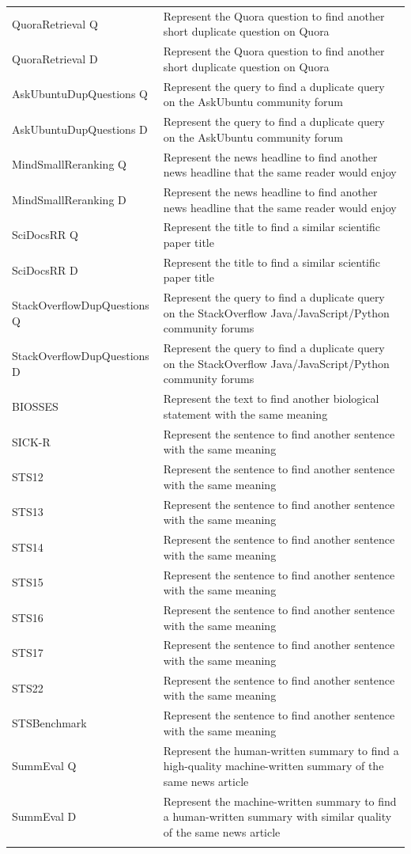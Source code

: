 \documentclass{article}
\begin{document}
\begin{longtable}{lp{9cm}}
QuoraRetrieval Q & Represent the Quora question to find another short duplicate question on Quora \\
QuoraRetrieval D & Represent the Quora question to find another short duplicate question on Quora \\
\midrule
AskUbuntuDupQuestions Q & Represent the query to find a duplicate query on the AskUbuntu community forum \\
AskUbuntuDupQuestions D & Represent the query to find a duplicate query on the AskUbuntu community forum \\
MindSmallReranking Q & Represent the news headline to find another news headline that the same reader would enjoy \\
MindSmallReranking D & Represent the news headline to find another news headline that the same reader would enjoy \\
SciDocsRR Q & Represent the title to find a similar scientific paper title \\
SciDocsRR D & Represent the title to find a similar scientific paper title \\
StackOverflowDupQuestions Q & Represent the query to find a duplicate query on the StackOverflow Java/JavaScript/Python community forums \\
StackOverflowDupQuestions D & Represent the query to find a duplicate query on the StackOverflow Java/JavaScript/Python community forums \\
\midrule
BIOSSES & Represent the text to find another biological statement with the same meaning \\
SICK-R & Represent the sentence to find another sentence with the same meaning \\
STS12 & Represent the sentence to find another sentence with the same meaning \\
STS13 & Represent the sentence to find another sentence with the same meaning \\
STS14 & Represent the sentence to find another sentence with the same meaning \\
STS15 & Represent the sentence to find another sentence with the same meaning \\
STS16 & Represent the sentence to find another sentence with the same meaning \\
STS17 & Represent the sentence to find another sentence with the same meaning \\
STS22 & Represent the sentence to find another sentence with the same meaning \\
STSBenchmark & Represent the sentence to find another sentence with the same meaning \\
\midrule
SummEval Q & Represent the human-written summary to find a high-quality machine-written summary of the same news article \\
SummEval D & Represent the machine-written summary to find a human-written summary with similar quality of the same news article \\
\bottomrule
\label{tab:medi2instructions}
\end{longtable}
\end{document}
